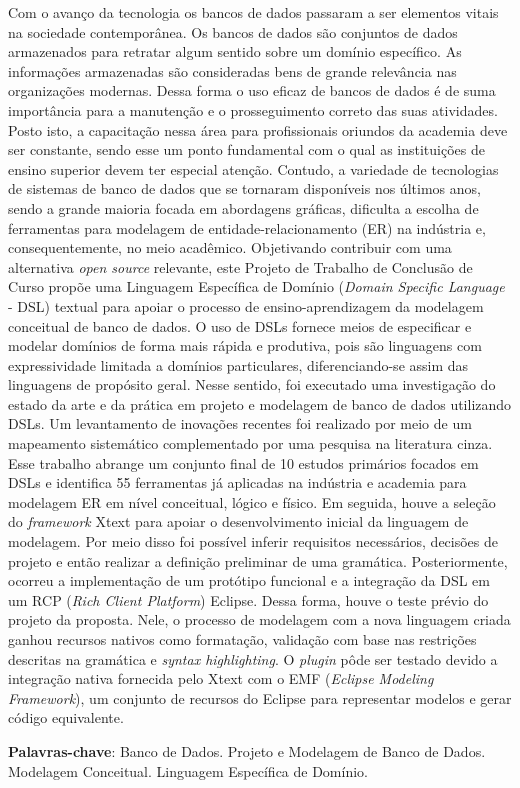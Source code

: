 \begin{resumo}


Com o avanço da tecnologia os bancos de dados passaram a ser elementos vitais na sociedade contemporânea. 
Os bancos de dados são conjuntos de dados armazenados para retratar algum sentido sobre um domínio específico. 
As informações armazenadas são consideradas bens de grande relevância nas organizações modernas. 
Dessa forma o uso eficaz de bancos de dados é de suma importância para a manutenção e o prosseguimento correto das suas atividades. 
Posto isto, a capacitação nessa área para profissionais oriundos da academia deve ser constante, sendo esse um ponto fundamental com o qual as instituições de ensino superior devem ter especial atenção.
Contudo, a variedade de tecnologias de sistemas de banco de dados que se tornaram disponíveis nos últimos anos, sendo a grande maioria focada em abordagens gráficas, dificulta a escolha de ferramentas para modelagem de entidade-relacionamento (ER) na indústria e, consequentemente, no meio acadêmico.
Objetivando contribuir com uma alternativa \textit{open source} relevante, este Projeto de Trabalho de Conclusão de Curso propõe uma Linguagem Específica de Domínio (\textit{Domain Specific Language} - DSL) textual para apoiar o processo de ensino-aprendizagem da modelagem conceitual de banco de dados. 
O uso de DSLs fornece meios de especificar e modelar domínios de forma mais rápida e produtiva, pois são linguagens com expressividade limitada a domínios particulares, diferenciando-se assim das linguagens de propósito geral. 
Nesse sentido, foi executado uma investigação do estado da arte e da prática em projeto e modelagem de banco de dados utilizando DSLs. 
Um levantamento de inovações recentes foi realizado por meio de um mapeamento sistemático complementado por uma pesquisa na literatura cinza.
Esse trabalho abrange um conjunto final de 10 estudos primários focados em DSLs e identifica 55 ferramentas já aplicadas na indústria e academia para modelagem ER em nível conceitual, lógico e físico.
Em seguida, houve a seleção do \textit{framework} Xtext para apoiar o desenvolvimento inicial da linguagem de modelagem.
Por meio disso foi possível inferir requisitos necessários, decisões de projeto e então realizar a definição preliminar de uma gramática.
Posteriormente, ocorreu a implementação de um protótipo funcional e a integração da DSL em um RCP (\textit{Rich Client Platform}) Eclipse. 
Dessa forma, houve o teste prévio do projeto da proposta. Nele, o processo de modelagem com a nova linguagem criada ganhou recursos nativos como formatação, validação com base nas restrições descritas na gramática e \textit{syntax highlighting}. 
O \textit{plugin} pôde ser testado devido a integração nativa fornecida pelo Xtext com o EMF (\textit{Eclipse Modeling Framework}), um conjunto de recursos do Eclipse para representar modelos e gerar código equivalente.

\vspace{\onelineskip}
    
\noindent
\textbf{Palavras-chave}: Banco de Dados. Projeto e Modelagem de Banco de Dados. Modelagem Conceitual. Linguagem Específica de Domínio.
\end{resumo}
